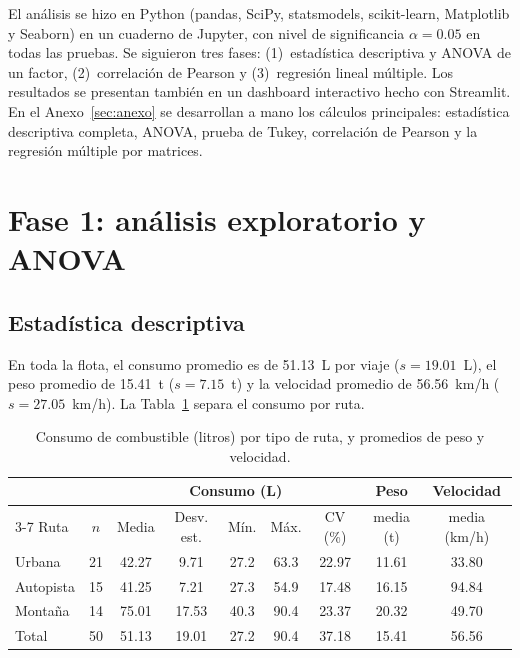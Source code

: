 \documentclass[12pt,letterpaper]{article}
\begin{document}
El análisis se hizo en Python (pandas, SciPy, statsmodels, scikit-learn, Matplotlib y Seaborn) en un cuaderno de Jupyter, con nivel de significancia $\alpha = 0.05$ en todas las pruebas. Se siguieron tres fases: (1)~estadística descriptiva y ANOVA de un factor, (2)~correlación de Pearson y (3)~regresión lineal múltiple. Los resultados se presentan también en un dashboard interactivo hecho con Streamlit. En el Anexo~\ref{sec:anexo} se desarrollan a mano los cálculos principales: estadística descriptiva completa, ANOVA, prueba de Tukey, correlación de Pearson y la regresión múltiple por matrices.

\section{Fase 1: análisis exploratorio y ANOVA}

\subsection{Estadística descriptiva}

En toda la flota, el consumo promedio es de 51.13~L por viaje ($s = 19.01$~L), el peso promedio de 15.41~t ($s = 7.15$~t) y la velocidad promedio de 56.56~km/h ($s = 27.05$~km/h). La Tabla~\ref{tab:desc} separa el consumo por ruta.

\begin{table}[H]
\centering
\caption{Consumo de combustible (litros) por tipo de ruta, y promedios de peso y velocidad.}
\label{tab:desc}
\small
\begin{tabular}{lcccccccc}
\toprule
 & & \multicolumn{5}{c}{Consumo (L)} & Peso & Velocidad \\
\cmidrule(lr){3-7}
Ruta & $n$ & Media & Desv. est. & Mín. & Máx. & CV (\%) & media (t) & media (km/h) \\
\midrule
Urbana    & 21 & 42.27 & 9.71  & 27.2 & 63.3 & 22.97 & 11.61 & 33.80 \\
Autopista & 15 & 41.25 & 7.21  & 27.3 & 54.9 & 17.48 & 16.15 & 94.84 \\
Montaña   & 14 & 75.01 & 17.53 & 40.3 & 90.4 & 23.37 & 20.32 & 49.70 \\
\midrule
Total     & 50 & 51.13 & 19.01 & 27.2 & 90.4 & 37.18 & 15.41 & 56.56 \\
\bottomrule
\end{tabular}
\end{table}
\end{document}

